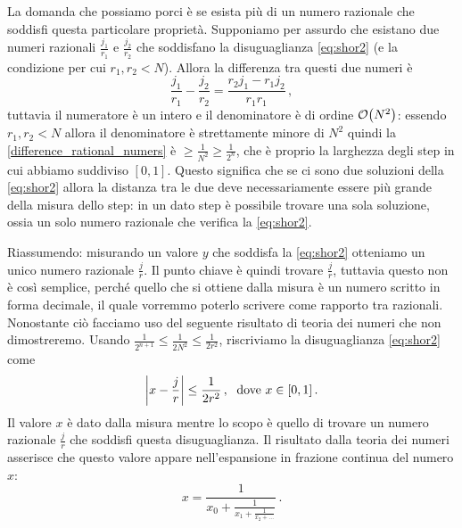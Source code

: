 \noindent La domanda che possiamo porci è se esista più di un numero razionale che soddisfi questa particolare proprietà. Supponiamo per assurdo che esistano due numeri razionali $\frac{j_1}{r_1}$ e $\frac{j_2}{r_2}$ che soddisfano la disuguaglianza \eqref{eq:shor2} (e la condizione per cui $r_1, r_2 < N$). Allora la differenza tra questi due numeri è
\begin{equation}\label{difference_rational_numers}
    \frac{j_1}{r_1} - \frac{j_2}{r_2} = \frac{r_2j_1-r_1j_2}{r_1r_1} \, ,
\end{equation}
tuttavia il numeratore è un intero e il denominatore è di ordine $\order{N^2}$: essendo $r_1, r_2 < N$ allora il denominatore è strettamente minore di $N^2$ quindi la \eqref{difference_rational_numers} è $\geq \frac 1{N^2} \geq \frac{1}{2^n}$, che è proprio la larghezza degli step in cui abbiamo suddiviso $[0,1]$. Questo significa che se ci sono due soluzioni della \eqref{eq:shor2} allora la distanza tra le due deve necessariamente essere più grande della misura dello step: in un dato step è possibile trovare una sola soluzione, ossia un solo numero razionale che verifica la \eqref{eq:shor2}.

\noindent Riassumendo: misurando un valore $y$ che soddisfa la \eqref{eq:shor2} otteniamo un unico numero razionale $\frac{j}{r}$. Il punto chiave è quindi trovare  $\frac jr$, tuttavia questo non è così semplice, perché quello che si ottiene dalla misura è un numero scritto in forma decimale, il quale vorremmo poterlo scrivere come rapporto tra razionali. Nonostante ciò facciamo uso del seguente risultato di teoria dei numeri che non dimostreremo. Usando $\frac{1}{2^{n+1}} \leq \frac{1}{2 N^2}\leq \frac{1}{2 r^2}$, riscriviamo la disuguaglianza \eqref{eq:shor2} come
\begin{equation*}
    \abs{x-\frac jr} \leq \frac 1{2r^2} \, , \; \text{ dove } x\in[0,1] \, .
\end{equation*}
Il valore $x$ è dato dalla misura mentre lo scopo è quello di trovare un numero razionale $\frac jr$ che soddisfi questa disuguaglianza. Il risultato dalla teoria dei numeri asserisce che questo valore appare nell'espansione in frazione continua del numero $x$:
\begin{equation*}
    x=\frac{1}{x_0+\frac{1}{x_1+\frac{1}{x_2+\ldots}}} \, .
\end{equation*}

